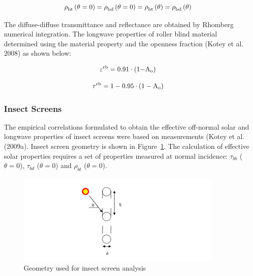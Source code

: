 {\begin{equation}
{\rm{\rho }}_{{\rm{bt}}}^{}\left( {{\rm{\theta }} = {\rm{0}}} \right) = {\rm{\rho }}_{{\rm{bd}}}^{}\left( {{\rm{\theta }} = {\rm{0}}} \right) = {\rm{\rho }}_{{\rm{bt}}}^{}\left( {\rm{\theta }} \right) = {\rm{\rho }}_{{\rm{bd}}}^{}\left( {\rm{\theta }} \right)
\end{equation}

The diffuse-diffuse transmittance and reflectance are obtained by Rhomberg numerical integration. The longwave properties of roller blind material determined using the material property and the openness fraction (Kotey et al. 2008) as shown below:

\begin{equation}
{\varepsilon ^{{\rm{rb}}}} = {\rm{0}}{\rm{.91}} \cdot \left( {{\rm{1 - }}{{\rm{A}}_{\rm{o}}}} \right)
\end{equation}

\begin{equation}
{\tau ^{{\rm{rb}}}} = {\rm{1}} - {\rm{0}}{\rm{.95}} \cdot \left( {{\rm{1}} - {{\rm{A}}_{\rm{o}}}} \right)
\end{equation}

\subsubsection{Insect Screens}\label{insect-screens}

The empirical correlations formulated to obtain the effective off-normal solar and longwave properties of insect screens were based on measurements (Kotey et al. (2009a). Insect screen geometry is shown in Figure~\ref{fig:geometry-used-for-insect-screen-analysis}. The calculation of effective solar properties requires a set of properties measured at normal incidence: $\tau_{bb}$ ($\theta = 0$), $\tau_{bd}$ ($\theta = 0$) and $\rho_{bt}$ ($\theta = 0$).

\begin{figure}[hbtp] %
\centering
\includegraphics[width=0.9\textwidth, height=0.9\textheight, keepaspectratio=true]{media/image1857.svg.png}
\caption{Geometry used for insect screen analysis \protect \label{fig:geometry-used-for-insect-screen-analysis}}
\end{figure}

}
